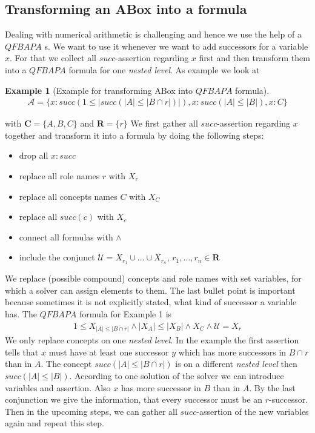 \documentclass[a4paper,11pt]{scrartcl}
\theoremstyle{break}
\theoremstyle{definition}
\newtheorem{ex}{Example}
\begin{document}
\subsection{Transforming an ABox into a formula}
Dealing with numerical arithmetic is challenging and hence we use the help of a $QFBAPA$ s. We want to use it whenever we want to add successors for a variable $x$. For that we collect all $succ$-assertion regarding $x$ first and then transform them into a $QFBAPA$ formula for one \textit{nested level}. As example we look at
\begin{ex}[Example for transforming ABox into $QFBAPA$ formula]
\begin{align*}
\mathcal{A}=\{x:succ(1\leq|succ(|A|\leq|B\cap r|)|), x:succ(|A|\leq |B|), x:C\}
\end{align*}
\end{ex}
with $\mathbf{C}=\{A,B,C\}$ and $\mathbf{R}=\{r\}$
We first gather all $succ$-assertion regarding $x$ together and transform it into a formula by doing the following steps:
\begin{itemize}
\item drop all $x:succ$
\item replace all role names $r$ with $X_r$
\item replace all concepts names $C$ with $X_C$
\item replace all $succ(c)$ with $X_{c}$
\item connect all formulas with $\wedge$
\item include the conjunct $\mathcal{U}=X_{r_1}\cup\dots\cup X_{r_n}$, $r_1,\dots, r_n\in\mathbf{R}$
\end{itemize}
We replace (possible compound) concepts and role names with set variables, for which a solver can assign elements to them. The last bullet point is important because sometimes it is not explicitly stated, what kind of successor a variable has. The $QFBAPA$ formula for Example 1 is 
\begin{align*}
1\leq X_{|A|\leq |B\cap r|}\wedge |X_A|\leq |X_B|\wedge X_C\wedge \mathcal{U}=X_r
\end{align*}
We only replace concepts on one \textit{nested level}. In the example the first assertion tells that $x$ must have at least one successor $y$ which has more successors in $B\cap r$ than in $A$. The concept $succ(|A|\leq|B\cap r|)$ is on a different \textit{nested level} then $succ(|A|\leq |B|)$. According to one solution of the solver we can introduce variables and assertion. Also $x$ has more successor in $B$ than in $A$. By the last conjunction we give the information, that every successor must be an $r$-successor. Then in the upcoming steps, we can gather all $succ$-assertion of the new variables again and repeat this step.
\end{document}
